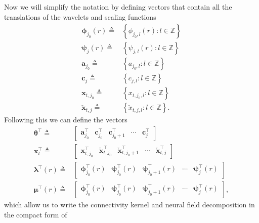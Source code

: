 \documentclass[review,authoryear,3p]{elsarticle}
\begin{document}
Now we will simplify the notation by defining vectors that contain all the translations of the wavelets and scaling functions 
\begin{align}      
	\boldsymbol\phi_{j_0}(r) \triangleq&\left\lbrace{\phi_{j_0,l}(r)}:l \in \mathbb{Z} \right\rbrace \\
	\boldsymbol\psi_{j}(r) \triangleq& \left\lbrace{\psi_{j,l}(r)}:l \in \mathbb{Z} \right\rbrace\\
	\mathbf{a}_{j_0} \triangleq& \left\lbrace a_{j_0, l}:l \in \mathbb{Z} \right\rbrace \\
	\mathbf{c}_{j} \triangleq& \left\lbrace c_{j, l}:l \in \mathbb{Z} \right\rbrace \\
	\mathbf{x}_{t,j_0} \triangleq& \left\lbrace{x}_{t,j_{0},l}:l \in \mathbb{Z} \right\rbrace \\
	\check{\mathbf{x}}_{t,j} \triangleq& \left\lbrace{\check{x}}_{t,j,l}:l \in \mathbb{Z} \right\rbrace.
\end{align}
Following this we can define the vectors 
\begin{align}
\boldsymbol\theta^\top \triangleq& [\begin{array}{ccccc} \mathbf{a}_{j_0}^\top & \mathbf{c}_{j_0}^\top & \mathbf{c}_{j_0+1}^\top & \cdots & \mathbf{c}_{j}^\top \end{array}] 
\label{KernelWeights} \\
\mathbf{x}_{t}^\top \triangleq& [\begin{array}{ccccc}\mathbf{x}_{t,j_{0}}^\top &  \check{\mathbf{x}}_{t,j_{0}}^\top & \check{\mathbf{x}}_{t,j_{0}+1}^\top & \cdots & \check{\mathbf{x}}_{t,j}^\top\end{array}]
\label{FieldWeights} \\
\label{KernelBasisVector}
\boldsymbol\lambda^\top(r) \triangleq& \left[
\begin{array}{ccccc} \boldsymbol\phi_{j_0}^\top(r) &
\boldsymbol\psi_{j_0}^\top(r) & 
\boldsymbol\psi_{j_0+1}^\top(r) &
\cdots &
\boldsymbol\psi_{j}^\top(r)\end{array}\right] \\
\label{FieldBasisVector}
\boldsymbol\mu^\top (r) \triangleq& \left[
\begin{array}{ccccc}\boldsymbol\phi_{j_0}^\top(r) &
\boldsymbol\psi_{j_0}^\top(r) & 
\boldsymbol\psi_{j_0+1}^\top(r) &
\cdots &
\boldsymbol\psi_{j}^\top(r)\end{array}\right],
\end{align}
which allow us to write the connectivity kernel and neural field  decomposition in the compact form of
\end{document}
